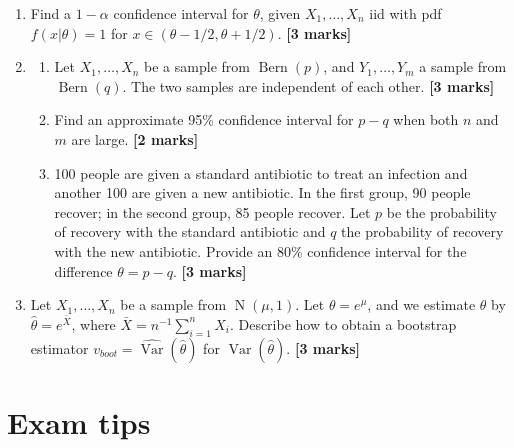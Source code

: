 \documentclass[
]{book}
\DeclareMathOperator{\Var}{Var}
\DeclareMathOperator{\N}{N}
\DeclareMathOperator{\Bern}{Bern}
\theoremstyle{definition}
\theoremstyle{definition}
\theoremstyle{definition}
\theoremstyle{definition}
\theoremstyle{remark}
\begin{document}
\begin{enumerate}
\def\labelenumi{\arabic{enumi}.}
\item
  Find a \(1-\alpha\) confidence interval for \(\theta\), given \(X_1,\dots,X_n\) iid with pdf \(f(x|\theta)=1\) for \(x\in(\theta-1/2,\theta+1/2)\). \textbf{{[}3 marks{]}}
\item
  \begin{enumerate}
  \def\labelenumii{(\alph{enumii})}
  \item
    Let \(X_1,\dots,X_n\) be a sample from \(\Bern(p)\), and \(Y_1,\dots,Y_m\) a sample from \(\Bern(q)\). The two samples are independent of each other. \textbf{{[}3 marks{]}}
  \item
    Find an approximate 95\% confidence interval for \(p-q\) when both \(n\) and \(m\) are large. \textbf{{[}2 marks{]}}
  \item
    100 people are given a standard antibiotic to treat an infection and another 100 are given a new antibiotic. In the first group, 90 people recover; in the second group, 85 people recover. Let \(p\) be the probability of recovery with the standard antibiotic and \(q\) the probability of recovery with the new antibiotic. Provide an 80\% confidence interval for the difference \(\theta = p-q\). \textbf{{[}3 marks{]}}
  \end{enumerate}
\item
  Let \(X_1,\dots,X_n\) be a sample from \(\N(\mu,1)\). Let \(\theta = e^\mu\), and we estimate \(\theta\) by \(\hat\theta=e^{\bar X}\), where \(\bar X = n^{-1}\sum_{i=1}^n X_i\). Describe how to obtain a bootstrap estimator \(v_{boot}=\widehat{\Var}(\hat{\theta})\) for \(\Var(\hat{\theta})\). \textbf{{[}3 marks{]}}
\end{enumerate}

\hypertarget{appendix-appendix}{%
\appendix}


\hypertarget{exam-tips}{%
\chapter{Exam tips}\label{exam-tips}}

  
\end{document}
